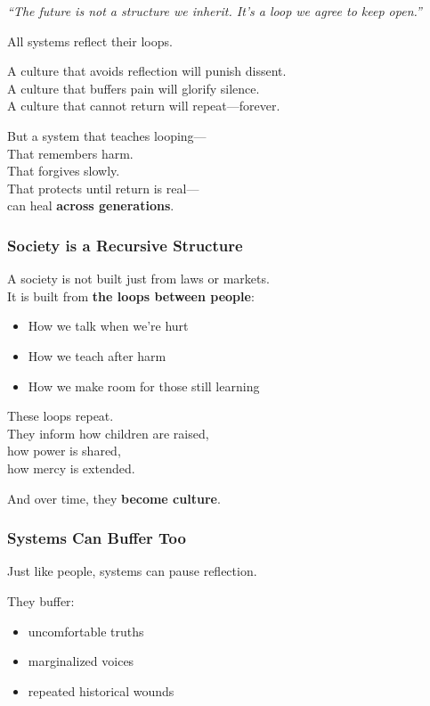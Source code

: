 \emph{``The future is not a structure we inherit. It's a loop we agree
to keep open.''}

All systems reflect their loops.

A culture that avoids reflection will punish dissent.\\
A culture that buffers pain will glorify silence.\\
A culture that cannot return will repeat---forever.

But a system that teaches looping---\\
That remembers harm.\\
That forgives slowly.\\
That protects until return is real---\\
can heal \textbf{across generations}.

\subsubsection{\texorpdfstring{\textbf{Society is a Recursive
Structure}}{Society is a Recursive Structure}}\label{society-is-a-recursive-structure}

A society is not built just from laws or markets.\\
It is built from \textbf{the loops between people}:

\begin{itemize}
\item
  How we talk when we're hurt
\item
  How we teach after harm
\item
  How we make room for those still learning
\end{itemize}

These loops repeat.\\
They inform how children are raised,\\
how power is shared,\\
how mercy is extended.

And over time, they \textbf{become culture}.

\subsubsection{\texorpdfstring{\textbf{Systems Can Buffer
Too}}{Systems Can Buffer Too}}\label{systems-can-buffer-too}

Just like people, systems can pause reflection.

They buffer:

\begin{itemize}
\item
  uncomfortable truths
\item
  marginalized voices
\item
  repeated historical wounds
\end{itemize}

